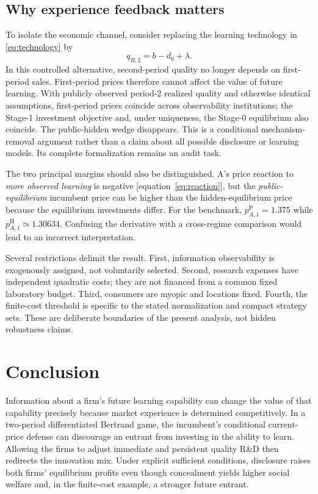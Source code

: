 \documentclass[11pt,a4paper]{article}
\numberwithin{equation}{section}
\theoremstyle{remark}
\newcommand{\PP}{\mathrm{P}}
\newcommand{\HH}{\mathrm{H}}
\begin{document}
\subsection{Why experience feedback matters}

To isolate the economic channel, consider replacing the learning technology in \eqref{eq:technology} by
\begin{equation}
q_{B,2}=b-d_0+\lambda. \label{eq:nofeedback}
\end{equation}
In this controlled alternative, second-period quality no longer depends on first-period sales. First-period prices therefore cannot affect the value of future learning. With publicly observed period-2 realized quality and otherwise identical assumptions, first-period prices coincide across observability institutions; the Stage-1 investment objective and, under uniqueness, the Stage-0 equilibrium also coincide. The public-hidden wedge disappears. This is a conditional mechanism-removal argument rather than a claim about all possible disclosure or learning models. Its complete formalization remains an audit task.

The two principal margins should also be distinguished. A's price reaction to \emph{more observed learning} is negative [equation~\eqref{eq:reaction}], but the \emph{public-equilibrium} incumbent price can be higher than the hidden-equilibrium price because the equilibrium investments differ. For the benchmark, $p_{A,1}^{\PP}=1.375$ while $p_{A,1}^{\HH}\simeq1.30634$. Confusing the derivative with a cross-regime comparison would lead to an incorrect interpretation.

Several restrictions delimit the result. First, information observability is exogenously assigned, not voluntarily selected. Second, research expenses have independent quadratic costs; they are not financed from a common fixed laboratory budget. Third, consumers are myopic and locations fixed. Fourth, the finite-cost threshold is specific to the stated normalization and compact strategy sets. These are deliberate boundaries of the present analysis, not hidden robustness claims.

\section{Conclusion}\label{sec:conclusion}

Information about a firm's future learning capability can change the value of that capability precisely because market experience is determined competitively. In a two-period differentiated Bertrand game, the incumbent's conditional current-price defense can discourage an entrant from investing in the ability to learn. Allowing the firms to adjust immediate and persistent quality R\&D then redirects the innovation mix. Under explicit sufficient conditions, disclosure raises both firms' equilibrium profits even though concealment yields higher social welfare and, in the finite-cost example, a stronger future entrant.
\end{document}
